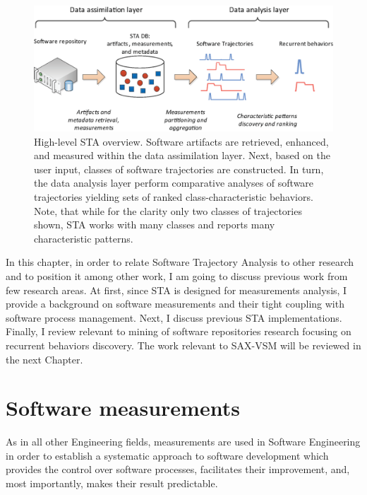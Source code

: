 \begin{figure}[h]
   \centering
   \includegraphics[width=150mm]{figures/Flow-analysis.eps}
   \caption{High-level STA overview. Software artifacts are retrieved, enhanced, and measured within the
   data assimilation layer. Next, based on the user input, classes of software trajectories are constructed.   
   In turn, the data analysis layer perform comparative analyses of software trajectories yielding sets
   of ranked class-characteristic behaviors.
   Note, that while for the clarity only two classes of trajectories shown, STA works with many classes and 
   reports many characteristic patterns.}
   \label{fig:sta-analysis}
\end{figure}

In this chapter, in order to relate Software Trajectory Analysis to other research and to position it 
among other work, I am going to discuss previous work from few research areas. 
At first, since STA is designed for measurements analysis, I provide a background on software measurements 
and their tight coupling with software process management. 
Next, I discuss previous STA implementations. 
Finally, I review relevant to mining of software repositories research focusing on recurrent behaviors discovery.
The work relevant to SAX-VSM will be reviewed in the next Chapter.

\section{Software measurements}
As in all other Engineering fields, measurements are used in Software Engineering in order to establish a 
systematic approach to software development which provides the control over software processes, facilitates
their improvement, and, most importantly, makes their result predictable. 

